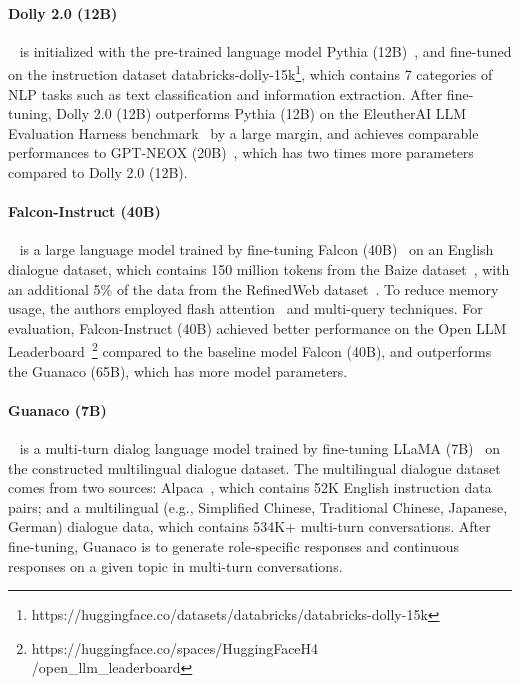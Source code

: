 \documentclass[11pt]{article}
\begin{document}
\paragraph{Dolly 2.0 (12B)}~\citep{conover2023free} is initialized with the pre-trained language model Pythia (12B)~\citep{Biderman2023PythiaAS}, and fine-tuned on the instruction dataset databricks-dolly-15k\footnote{https://huggingface.co/datasets/databricks/databricks-dolly-15k}, which contains 7 categories of NLP tasks such as text classification and information extraction. After fine-tuning, Dolly 2.0 (12B) outperforms Pythia (12B) on the EleutherAI LLM Evaluation Harness benchmark~\citep{gao2021framework} by a large margin, and achieves comparable performances to GPT-NEOX (20B)~\citep{Black2022GPTNeoX20BAO}, which has two times more parameters compared to Dolly 2.0 (12B). 


\paragraph{Falcon-Instruct (40B)}~\citep{falcon40b} is a large language model trained by fine-tuning Falcon (40B)~\citep{almazrouei2023falcon} on an English dialogue dataset, which contains 150 million tokens from the Baize dataset~\citep{Xu2023BaizeAO}, with an additional 5\% of the data from the RefinedWeb dataset~\citep{penedo2023refinedweb}. To reduce memory usage, the authors employed flash attention~\citep{dao2022flashattention} and multi-query techniques. For evaluation, Falcon-Instruct (40B) achieved better performance on the Open LLM Leaderboard~\citep{beeching2023open}\footnote{https://huggingface.co/spaces/HuggingFaceH4\\/open\_llm\_leaderboard} compared to the baseline model Falcon (40B), and outperforms the Guanaco (65B), which has more model parameters.


\paragraph{Guanaco (7B)}~\citep{Guanaco} is a
multi-turn dialog 
 language model  trained by fine-tuning LLaMA (7B)~\citep{Touvron2023LLaMAOA}  on the constructed multilingual dialogue dataset. The multilingual dialogue dataset comes from two sources:  Alpaca~\citep{taori2023alpaca}, which contains 52K English instruction data pairs; and a multilingual (e.g., Simplified Chinese, Traditional Chinese, Japanese, German) dialogue data, which contains 534K+ multi-turn conversations. 
After fine-tuning, Guanaco 
is to generate role-specific responses and continuous responses on a given topic in multi-turn conversations. 
\end{document}
